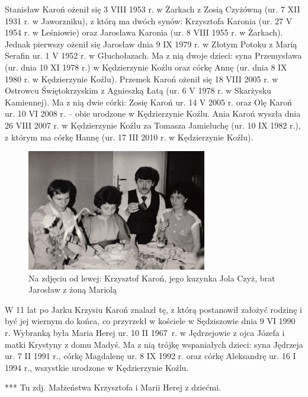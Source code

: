 Stanisław Karoń ożenił się 3 VIII 1953 r. w Żarkach z Zosią Czyżówną (ur. 7 XII 1931 r. w Jaworzniku), z którą ma dwóch synów: Krzysztofa Karonia (ur. 27 V 1954 r. w Leśniowie) oraz Jarosława Karonia (ur. 8 VIII 1955 r. w Żarkach). Jednak pierwszy ożenił się Jarosław dnia 9 IX 1979 r. w Złotym Potoku z Marią Serafin ur. 1 V 1952 r. w Głuchołazach. Ma z nią dwoje dzieci: syna Przemysława (ur. dnia 10 XI 1978 r.) w Kędzierzynie Koźlu oraz córkę Annę (ur. dnia 8 IX 1980 r. w Kędzierzynie Koźlu). Przemek Karoń ożenił się 18 VIII 2005 r. w Ostrowcu Świętokrzyskim z Agnieszką Łatą (ur. 6 V 1978 r. w Skarżysku Kamiennej). Ma z nią dwie córki: Zosię Karoń ur. 14 V 2005 r. oraz Olę Karoń ur. 10 VI 2008 r. -- obie urodzone w Kędzierzynie Koźlu. Ania Karoń wyszła dnia 26 VIII 2007 r. w Kędzierzynie Koźlu za Tomasza Jamieluchę (ur. 10 IX 1982 r.), z którym ma córkę Hannę (ur. 17 III 2010 r. w Kędzierzynie Koźlu).

\begin{figure}[!h]
\begin{center}
\includegraphics[width=0.7\textwidth]{zdjecia/krzysztof_karon_jarek_karon_z_zona.jpg}
\caption[Krzysztof, Jarosław i Mariola Karoniowie]{Na zdjęciu od lewej: Krzysztof Karoń, jego kuzynka Jola Czyż, brat Jarosław z żoną Mariolą}
\label{rys:krzysztof_karon_jarek_karon_z_zona.jpg}
\end{center}
\end{figure}

W 11 lat po Jarku Krzysiu Karoń znalazł tę, z którą postanowił założyć rodzinę i być jej wiernym do końca, co przyrzekł w kościele w Sędziszowie dnia 9 VI 1990 r. Wybranką była Maria Herej ur. 10 II 1967~r. w Jędrzejowie z ojca Józefa i matki Krystyny z domu Madyś. Ma z nią trójkę wspaniałych dzieci: syna Jędrzeja ur. 7 II 1991 r., córkę Magdalenę ur. 8 IX 1992 r. oraz córkę Aleksandrę ur. 16 I 1994 r., wszystkie urodzone w Kędzierzynie Koźlu.


{\color{red}
*** Tu zdj. Małżeństwa Krzysztofa i Marii Herej z dziećmi.}